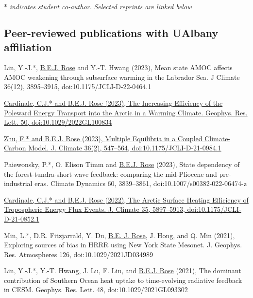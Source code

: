 \documentclass[11pt, letterpaper]{article} %
\newcommand{\years}[1]{\marginnote{\scriptsize #1}} %
\newcommand{\publink}{http://www.atmos.albany.edu/facstaff/brose/resources/Publications/}
\begin{document}
* \emph{indicates student co-author.} \emph{Selected reprints are linked below}

\subsection*{Peer-reviewed publications with UAlbany affiliation}  

\years{2023}
Lin, Y.-J.*, \underline{B.E.J. Rose} and Y.-T. Hwang (2023), Mean state AMOC affects AMOC weakening through subsurface warming in the Labrador Sea. J Climate 36(12), 3895--3915, doi:10.1175/JCLI-D-22-0464.1
\vspace{0.2 cm}

\href{\publink Cardinale_Rose_GRL2023.pdf}{Cardinale, C.J.* and \underline{B.E.J. Rose} (2023), The Increasing Efficiency of the Poleward Energy Transport into the Arctic in a Warming Climate. Geophys. Res. Lett. 50, doi:10.1029/2022GL100834}
\vspace{0.2 cm} 

\href{\publink Zhu_Rose_JClim2023.pdf}{Zhu, F.* and \underline{B.E.J. Rose} (2023), Multiple Equilibria in a Coupled Climate-Carbon Model. J. Climate 36(2), 547--564, doi:10.1175/JCLI-D-21-0984.1}
\vspace{0.2 cm} 

Paiewonsky, P.*, O. Elison Timm and \underline{B.E.J. Rose} (2023), State dependency of the forest-tundra-short wave feedback: comparing the mid-Pliocene and pre-industrial eras. Climate Dynamics 60, 3839--3861, doi:10.1007/s00382-022-06474-z
\vspace{0.2 cm}

\years{2022}

\href{\publink Cardinale_Rose_JClim2022.pdf}{Cardinale, C.J.* and \underline{B.E.J. Rose} (2022), The Arctic Surface Heating Efficiency of Tropospheric Energy Flux Events. J. Climate 35, 5897--5913, doi:10.1175/JCLI-D-21-0852.1}
\vspace{0.2 cm} 

\years{2021}
Min, L.*, D.R. Fitzjarrald, Y. Du, \underline{B.E. J. Rose}, J. Hong, and Q. Min (2021), Exploring sources of bias in HRRR using New York State Mesonet. J. Geophys. Res. Atmospheres 126, doi:10.1029/2021JD034989
\vspace{0.2 cm}

Lin, Y.-J.*, Y.-T. Hwang, J. Lu, F. Liu, and \underline{B.E.J. Rose} (2021), The dominant contribution of Southern Ocean heat uptake to time-evolving radiative feedback in CESM. Geophys. Res. Lett. 48, doi:10.1029/2021GL093302
\vspace{0.2 cm}
\end{document}
